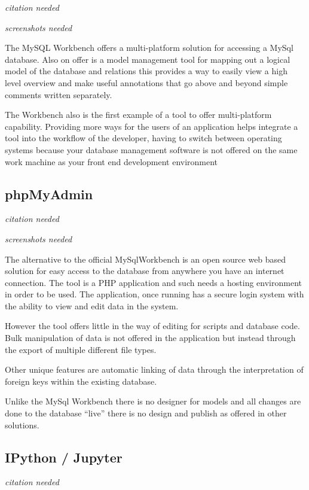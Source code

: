 \emph{citation needed}

\emph{screenshots needed}

The MySQL Workbench offers a multi-platform solution for accessing a
MySql database. Also on offer is a model management tool for mapping out
a logical model of the database and relations this provides a way to
easily view a high level overview and make useful annotations that go
above and beyond simple comments written separately.

The Workbench also is the first example of a tool to offer
multi-platform capability. Providing more ways for the users of an
application helps integrate a tool into the workflow of the developer,
having to switch between operating systems because your database
management software is not offered on the same work machine as your
front end development environment

\subsection{phpMyAdmin}\label{phpmyadmin}

\emph{citation needed}

\emph{screenshots needed}

The alternative to the official MySqlWorkbench is an open source web
based solution for easy access to the database from anywhere you have an
internet connection. The tool is a PHP application and such needs a
hosting environment in order to be used. The application, once running
has a secure login system with the ability to view and edit data in the
system.

However the tool offers little in the way of editing for scripts and
database code. Bulk manipulation of data is not offered in the
application but instead through the export of multiple different file
types.

Other unique features are automatic linking of data through the
interpretation of foreign keys within the existing database.

Unlike the MySql Workbench there is no designer for models and all
changes are done to the database ``live'' there is no design and publish
as offered in other solutions.

\subsection{IPython / Jupyter}\label{ipython-jupyter}

\emph{citation needed}

